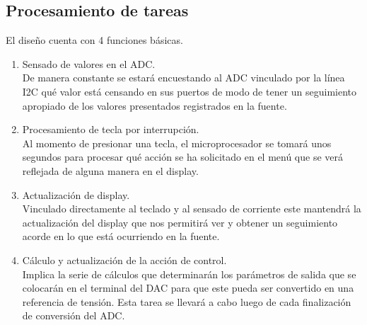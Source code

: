 \subsection{Procesamiento de tareas}
El diseño cuenta con 4 funciones básicas.
\begin{enumerate}
    \item Sensado de valores en el ADC.\\
    De manera constante se estará encuestando al ADC vinculado por la línea I2C qué valor está censando en sus puertos de modo de tener un seguimiento apropiado de los valores presentados registrados en la fuente.    
    \item Procesamiento de tecla por interrupción.\\
    Al momento de presionar una tecla, el microprocesador se tomará unos segundos para procesar qué acción se ha solicitado en el menú que se verá reflejada de alguna manera en el display.
    \item Actualización de display.\\
    Vinculado directamente al teclado y al sensado de corriente este mantendrá la actualización del display que nos permitirá ver y obtener un seguimiento acorde en lo que está ocurriendo en la fuente.
    \item Cálculo y actualización de la acción de control.\\
    Implica la serie de cálculos que determinarán los parámetros de salida que se colocarán en el terminal del DAC para que este pueda ser convertido en una referencia de tensión. Esta tarea se llevará a cabo luego de cada finalización de conversión del ADC.
\end{enumerate}

